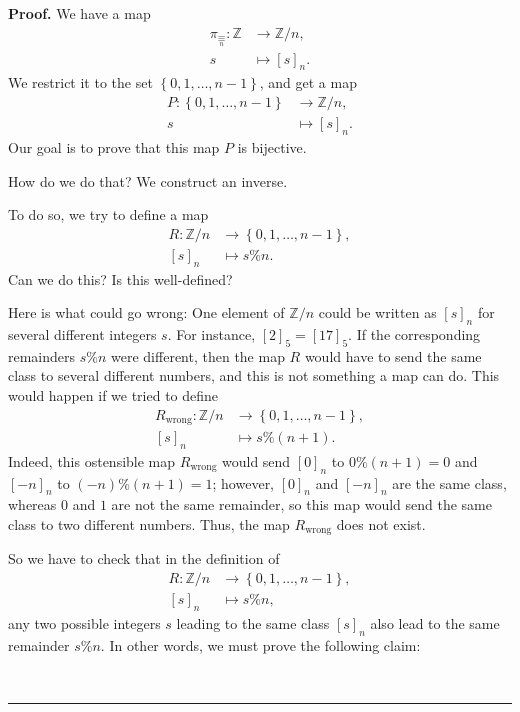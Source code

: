 \documentclass[numbers=enddot,12pt,final,onecolumn,notitlepage]{scrartcl}%
\numberwithin{exer}{subsection}
\theoremstyle{definition}
\newenvironment{proof}[1][Proof]{\noindent\textbf{#1.} }{\ \rule{0.5em}{0.5em}}
\begin{document}
\begin{proof}
We have a map%
\begin{align*}
\pi_{\underset{n}{\equiv}}:\mathbb{Z}  &  \rightarrow\mathbb{Z}/n,\\
s  &  \mapsto\left[  s\right]  _{n}.
\end{align*}
We restrict it to the set $\left\{  0,1,\ldots,n-1\right\}  $, and get a map%
\begin{align*}
P:\left\{  0,1,\ldots,n-1\right\}   &  \rightarrow\mathbb{Z}/n,\\
s  &  \mapsto\left[  s\right]  _{n}.
\end{align*}
Our goal is to prove that this map $P$ is bijective.

How do we do that? We construct an inverse.

To do so, we try to define a map%
\begin{align*}
R:\mathbb{Z}/n  &  \rightarrow\left\{  0,1,\ldots,n-1\right\}  ,\\
\left[  s\right]  _{n}  &  \mapsto s\%n.
\end{align*}
Can we do this? Is this well-defined?

Here is what could go wrong: One element of $\mathbb{Z}/n$ could be written as
$\left[  s\right]  _{n}$ for several different integers $s$. For instance,
$\left[  2\right]  _{5}=\left[  17\right]  _{5}$. If the corresponding
remainders $s\%n$ were different, then the map $R$ would have to send the same
class to several different numbers, and this is not something a map can do.
This would happen if we tried to define%
\begin{align*}
R_{\operatorname*{wrong}}:\mathbb{Z}/n  &  \rightarrow\left\{  0,1,\ldots
,n-1\right\}  ,\\
\left[  s\right]  _{n}  &  \mapsto s\%\left(  n+1\right)  .
\end{align*}
Indeed, this ostensible map $R_{\operatorname*{wrong}}$ would send $\left[
0\right]  _{n}$ to $0\%\left(  n+1\right)  =0$ and $\left[  -n\right]  _{n}$
to $\left(  -n\right)  \%\left(  n+1\right)  =1$; however, $\left[  0\right]
_{n}$ and $\left[  -n\right]  _{n}$ are the same class, whereas $0$ and $1$
are not the same remainder, so this map would send the same class to two
different numbers. Thus, the map $R_{\operatorname*{wrong}}$ does not exist.

So we have to check that in the definition of
\begin{align*}
R:\mathbb{Z}/n  &  \rightarrow\left\{  0,1,\ldots,n-1\right\}  ,\\
\left[  s\right]  _{n}  &  \mapsto s\%n,
\end{align*}
any two possible integers $s$ leading to the same class $\left[  s\right]
_{n}$ also lead to the same remainder $s\%n$. In other words, we must prove
the following claim:


\end{proof}
\end{document}
